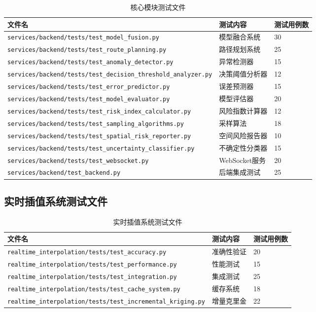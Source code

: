 \documentclass[12pt,a4paper,openany]{report}
\begin{document}
\begin{table}[h]
\centering
\caption{核心模块测试文件}
\begin{tabular}{|l|l|l|}
\hline
\textbf{文件名} & \textbf{测试内容} & \textbf{测试用例数} \\
\hline
\texttt{services/backend/tests/test\_model\_fusion.py} & 模型融合系统 & 30 \\
\texttt{services/backend/tests/test\_route\_planning.py} & 路径规划系统 & 25 \\
\texttt{services/backend/tests/test\_anomaly\_detector.py} & 异常检测器 & 15 \\
\texttt{services/backend/tests/test\_decision\_threshold\_analyzer.py} & 决策阈值分析器 & 12 \\
\texttt{services/backend/tests/test\_error\_predictor.py} & 误差预测器 & 15 \\
\texttt{services/backend/tests/test\_model\_evaluator.py} & 模型评估器 & 20 \\
\texttt{services/backend/tests/test\_risk\_index\_calculator.py} & 风险指数计算器 & 12 \\
\texttt{services/backend/tests/test\_sampling\_algorithms.py} & 采样算法 & 18 \\
\texttt{services/backend/tests/test\_spatial\_risk\_reporter.py} & 空间风险报告器 & 10 \\
\texttt{services/backend/tests/test\_uncertainty\_classifier.py} & 不确定性分类器 & 15 \\
\texttt{services/backend/tests/test\_websocket.py} & WebSocket服务 & 20 \\
\texttt{services/backend/test\_backend.py} & 后端集成测试 & 25 \\
\hline
\end{tabular}
\end{table}

\subsection{实时插值系统测试文件}

\begin{table}[h]
\centering
\caption{实时插值系统测试文件}
\begin{tabular}{|l|l|l|}
\hline
\textbf{文件名} & \textbf{测试内容} & \textbf{测试用例数} \\
\hline
\texttt{realtime\_interpolation/tests/test\_accuracy.py} & 准确性验证 & 20 \\
\texttt{realtime\_interpolation/tests/test\_performance.py} & 性能测试 & 15 \\
\texttt{realtime\_interpolation/tests/test\_integration.py} & 集成测试 & 25 \\
\texttt{realtime\_interpolation/tests/test\_cache\_system.py} & 缓存系统 & 18 \\
\texttt{realtime\_interpolation/tests/test\_incremental\_kriging.py} & 增量克里金 & 22 \\
\hline
\end{tabular}
\end{table}
\end{document}
